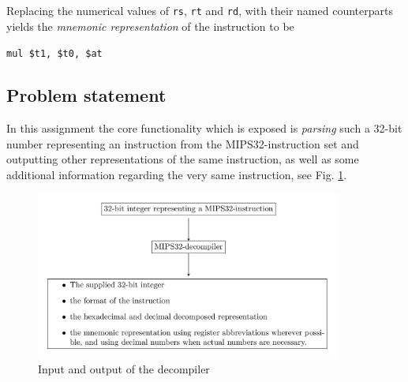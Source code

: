 Replacing the numerical values of \texttt{rs}, \texttt{rt} and
\texttt{rd}, with their named counterparts yields the \emph{mnemonic
representation} of the instruction to be

\begin{center}
  \texttt{mul \$t1, \$t0, \$at}
\end{center}

\subsection{Problem statement}

In this assignment the core functionality which is exposed is
\emph{parsing} such a 32-bit number representing an instruction from
the MIPS32-instruction set and outputting other representations of the
same instruction, as well as some additional information regarding the
very same instruction, see Fig. \ref{fig:mips32-decompiler}.

\begin{figure}[H]
  \centering
  \includegraphics[width=0.9\textwidth]{figures/mips32-decompiler.png}
  \caption{Input and output of the decompiler}
  \label{fig:mips32-decompiler}
\end{figure}


